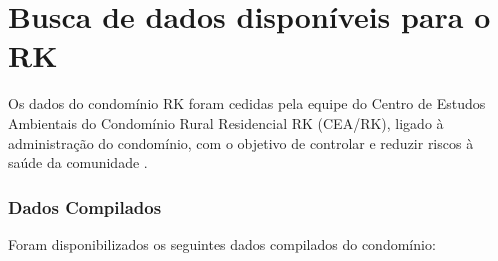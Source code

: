 



\section{Busca de dados disponíveis para o RK}

Os dados do condomínio RK foram cedidas pela equipe do Centro de Estudos Ambientais do Condomínio Rural Residencial RK (CEA/RK), ligado à administração do condomínio, com o objetivo de controlar e reduzir riscos à saúde da comunidade \cite{CondominioRK:online}. 

\subsubsection{Dados Compilados}

Foram disponibilizados os seguintes dados compilados do condomínio:


